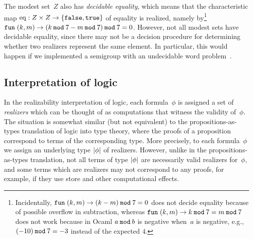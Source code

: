 The modest set~$Z$ also has \emph{decidable equality}, which means
that the characteristic map $\mathrm{eq} : Z \times Z \to
\{\mathtt{false}, \mathtt{true}\}$ of equality is realized, namely
by\footnote{Incidentally, $\mathtt{fun}\;(k,m) \to (k - m) \mathbin{\mathtt{mod}} 7 = 0$ does not
  decide equality because of possible overflow in subtraction, whereas
  $\mathtt{fun}\;(k,m) \to k \mathbin{\mathtt{mod}} 7 = m \mathbin{\mathtt{mod}} 7$ does not work because in Ocaml
  $a \mathbin{\mathtt{mod}} b$ is negative when~$a$ is negative, e.g., $(-10) \mathbin{\mathtt{mod}} 7 =
  -3$ instead of the expected $4$.} $\mathtt{fun}\;(k,m) \to (k \mathbin{\mathtt{mod}} 7 - m \mathbin{\mathtt{mod}}
  7) \mathbin{\mathtt{mod}} 7 = 0$. However, not all modest sets have decidable
equality, since there may not be a decision procedure for determining
whether two realizers represent the same element. In particular, this
would happen if we implemented a semigroup with an undecidable word
problem~\cite{post47:_recur_unsol_probl_thue}.


\subsection{Interpretation of logic}
\label{sec:interpretation-logic}

In the realizability interpretation of logic, each formula~$\phi$ is
assigned a set of \emph{realizers} which can be thought of as
computations that witness the validity of~$\phi$. The situation is
somewhat similar (but not equivalent) to the propositions-as-types
translation of logic into type theory, where the proofs of a
proposition correspond to terms of the corresponding type. More
precisely, to each formula~$\phi$ we assign an underlying type
$|\phi|$ of realizers. However, unlike in the
propositions-as-types translation, not all terms of type
$|\phi|$ are necessarily valid realizers for~$\phi$, and some
terms which are realizers may not correspond to any proofs, for
example, if they use store and other computational effects.

